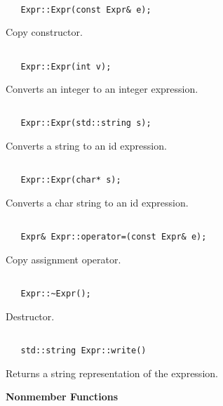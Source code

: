 \documentclass{article}
\begin{document}
\noindent
\hrulefill

\begin{verbatim}

   Expr::Expr(const Expr& e);

\end{verbatim}
Copy constructor.

\noindent
\hrulefill

\begin{verbatim}

   Expr::Expr(int v);

\end{verbatim}
Converts an integer to an integer expression.

\noindent
\hrulefill

\begin{verbatim}

   Expr::Expr(std::string s);

\end{verbatim}
Converts a string to an id expression.

\noindent
\hrulefill

\begin{verbatim}

   Expr::Expr(char* s);

\end{verbatim}
Converts a char string to an id expression.

\noindent
\hrulefill

\begin{verbatim}

   Expr& Expr::operator=(const Expr& e);

\end{verbatim}
Copy assignment operator.

\noindent
\hrulefill

\begin{verbatim}

   Expr::~Expr();

\end{verbatim}
Destructor.

\noindent
\hrulefill

\begin{verbatim}

   std::string Expr::write()

\end{verbatim}
Returns a string representation of the expression.

\vspace{1cm}
\noindent
{\bf Nonmember Functions}
\end{document}
